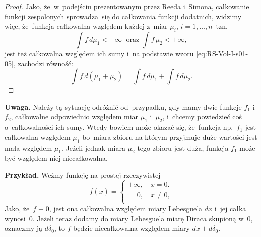 \documentclass[a4paper,11pt]{article}
\begin{document}
\begin{proof}
  Jako, że~w~podejściu prezentowanym przez Reeda i~Simona, całkowanie
  funkcji zespolonych sprowadza~się do całkowania funkcji dodatnich,
  widzimy więc, że~funkcja całkowalna względem każdej z~miar
  $\mu_{ i }$, $i = 1, \ldots, n$~tzn.
  \begin{equation}
    \label{eq:RS-Vol-I-s01-05}
    \int f \, d\mu_{ 1 } < +\infty \; \textrm{  oraz  }
    \int f \, \mu_{ 2 } < +\infty,
  \end{equation}
  jest też całkowalna względem ich sumy i~na podstawie wzoru
  \eqref{eq:RS-Vol-I-s01-05}, zachodzi równość:
  \begin{equation}
    \label{eq:RS-Vol-I-s01-06}
    \int f \, d( \mu_{ 1 } + \mu_{ 2 } )
    = \int f \, d\mu_{ 1 }  + \int f \, d\mu_{ 2 }.
  \end{equation}

\end{proof}





\textbf{Uwaga.} Należy tą sytuację odróżnić od~przypadku, gdy mamy dwie
funkcje $f_{ 1 }$ i~$f_{ 2 }$, całkowalne odpowiednio względem miar
$\mu_{ 1 }$ i~$\mu_{ 2 }$, i~chcemy powiedzieć coś o~całkowalności ich
sumy. Wtedy bowiem może okazać się, że~funkcja np.~$f_{ 1 }$ jest
całkowalna względem $\mu_{ 1 }$ bo~miara zbioru na którym przyjmuje
duże wartości jest mała względem $\mu_{ 1 }$. Jeżeli jednak miara
$\mu_{ 2 }$ tego zbioru jest duża, funkcja $f_{ 1 }$ może być względem
niej niecałkowalna.

\textbf{Przykład.} Weźmy funkcję na prostej rzeczywistej
\begin{equation}
  \label{RS-Vol-I-s01-07}
  f( x ) =
  \begin{cases}
    +\infty, \quad x = 0. \\
    \quad \;0, \quad x \neq 0, \\
  \end{cases}
\end{equation}
Jako, że~$f \equiv 0$, jest ona całkowalna względem miary Lebesgue'a
$dx$ i~jej całka wynosi~0. Jeżeli teraz dodamy do miary Lebesgue'a
miarę Diraca skupioną w~0, oznaczmy ją $d\delta_{ 0 }$, to $f$ będzie
niecałkowalna względem miary $dx + d\delta_{ 0 }$. %

\vspace{\spaceThree}
\end{document}
